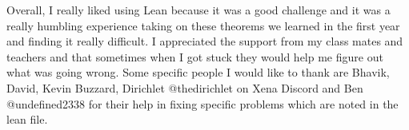 \documentclass{article}
\begin{document}
Overall, I really liked using Lean because it was a good challenge and it was a really humbling experience taking on these theorems we learned in the first year and finding it really difficult. I appreciated the support from my class mates and teachers and that sometimes when I got stuck they would help me figure out what was going wrong. Some specific people I would like to thank are Bhavik, David, Kevin Buzzard, Dirichlet @thedirichlet on Xena Discord and Ben @undefined2338 for their help in fixing specific problems which are noted in the lean file.
\end{document}
